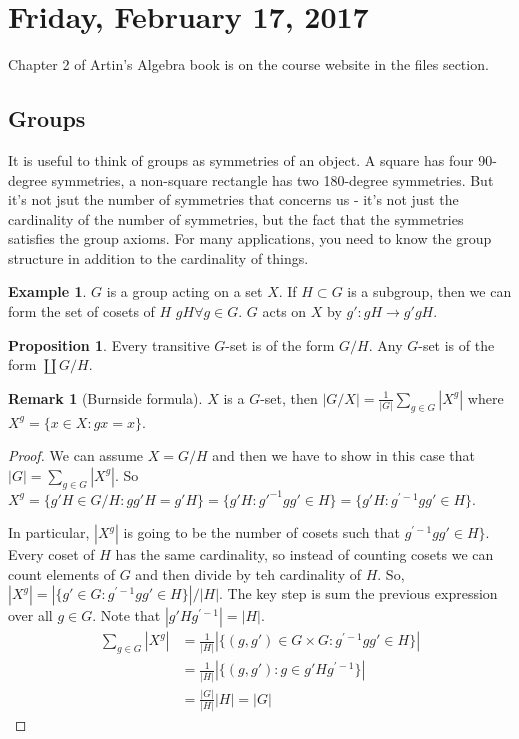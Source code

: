 \documentclass[12pt]{article}
\theoremstyle{definition}
\newtheorem{prop}{Proposition}
\newtheorem{exmp}{Example}[section]
\newtheorem{remark}{Remark}
\begin{document}
\section{Friday, February 17, 2017}

Chapter 2 of Artin's Algebra book is on the course website in the files
section.

\subsection{Groups}

It is useful to think of groups as symmetries of an object. A square has four
90-degree symmetries, a non-square rectangle has two 180-degree symmetries. But
it's not jsut the number of symmetries that concerns us - it's not just the
cardinality of the number of symmetries, but the fact that the symmetries
satisfies the group axioms. For many applications, you need to know the group
structure in addition to the cardinality of things.

\begin{exmp}
    $G$ is a group acting on a set $X$. If $H \subset G$ is a subgroup, then we
    can form the set of cosets of $H$ $gH \forall g \in G$. $G$ acts on $X$ by
    $g': gH \rightarrow g'gH$.
\end{exmp}

\begin{prop}
    Every transitive $G$-set is of the form $G/H$. Any $G$-set is of the form
    $\coprod G/H$. 
\end{prop}

\begin{remark}[Burnside formula]
    $X$ is a $G$-set, then $|G/X| = \frac{1}{|G|} \sum_{g \in G} |X^g|$ where
    $X^g = \{ x \in X: gx = x\}$.
\end{remark}

\begin{proof}
    We can assume $X = G/H$ and then we have to show in this case that $|G| =
    \sum_{g \in G} |X^g|$. So $X^g = \{g'H \in G/H : gg'H = g'H \} = \{g'H :
        g'^{-1}gg' \in H \} = \{g'H : g^{'-1}gg' \in H\}$.

    In particular, $|X^g|$ is going to be the number of cosets such that
    $g^{'-1}gg' \in H\}$. Every coset of $H$ has the same cardinality, so
    instead of counting cosets we can count elements of $G$ and then divide by
    teh cardinality of $H$. So, $|X^g| = |\{g' \in G : g^{'-1}gg' \in H\}| /
    |H|$. The key step is sum the previous expression over all $g \in G$. Note
    that $|g'Hg^{'-1}| = |H|$.
    \begin{align*}
        \sum_{g \in G} |X^g| &= \frac{1}{|H|} |\{(g, g') \in G \times G : g^{'-1}gg' \in H\}|\\
        &= \frac{1}{|H|} |\{(g, g') : g \in g'Hg^{'-1}\}| \\
        &= \frac{|G|}{|H|}|H|= |G| 
    \end{align*}
\end{proof}
\end{document}
